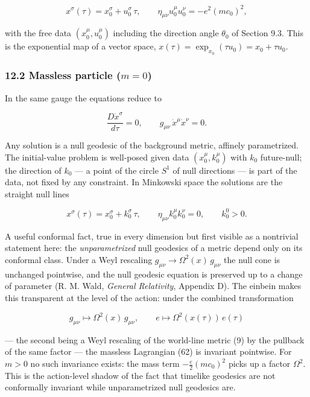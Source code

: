 \documentclass[
]{article}
\begin{document}
\[x^{\sigma}(\tau) = x^{\sigma}_{0} + u^{\sigma}_{0}\, \tau, \qquad \eta_{\mu\nu} u^{\mu}_{0} u^{\nu}_{0} = - e^{2} (mc_{0})^{2}, \tag{79}\]

with the free data \((x^{\mu}_{0}, u^{\mu}_{0})\) including the
direction angle \(\theta_{0}\) of Section 9.3. This is the exponential
map of a vector space,
\(x(\tau) = \exp_{x_{0}}(\tau u_{0}) = x_{0} + \tau u_{0}\).

\hypertarget{massless-particle-m-0}{%
\subsubsection{\texorpdfstring{12.2 Massless particle
(\(m = 0\))}{12.2 Massless particle (m = 0)}}\label{massless-particle-m-0}}

In the same gauge the equations reduce to

\[\frac{D \dot{x}^{\sigma}}{d\tau} = 0, \qquad g_{\mu\nu}\, \dot{x}^{\mu} \dot{x}^{\nu} = 0. \tag{80}\]

Any solution is a null geodesic of the background metric, affinely
parametrized. The initial-value problem is well-posed given data
\((x^{\mu}_{0}, k^{\mu}_{0})\) with \(k_{0}\) future-null; the direction
of \(k_{0}\) --- a point of the circle \(S^{1}\) of null directions ---
is part of the data, not fixed by any constraint. In Minkowski space the
solutions are the straight null lines

\[x^{\sigma}(\tau) = x^{\sigma}_{0} + k^{\sigma}_{0}\, \tau, \qquad \eta_{\mu\nu} k^{\mu}_{0} k^{\nu}_{0} = 0, \qquad k^{0}_{0} > 0. \tag{81}\]

A useful conformal fact, true in every dimension but first visible as a
nontrivial statement here: the \emph{unparametrized} null geodesics of a
metric depend only on its conformal class. Under a Weyl rescaling
\(g_{\mu\nu} \to \Omega^{2}(x)\, g_{\mu\nu}\) the null cone is unchanged
pointwise, and the null geodesic equation is preserved up to a change of
parameter (R. M. Wald, \emph{General Relativity}, Appendix D). The
einbein makes this transparent at the level of the action: under the
combined transformation

\[g_{\mu\nu} \longmapsto \Omega^{2}(x)\, g_{\mu\nu}, \qquad e \longmapsto \Omega^{2}(x(\tau))\, e(\tau) \tag{82}\]

--- the second being a Weyl rescaling of the world-line metric (9) by
the pullback of the same factor --- the massless Lagrangian (62) is
invariant pointwise. For \(m > 0\) no such invariance exists: the mass
term \(-\frac{e}{2}(mc_{0})^{2}\) picks up a factor \(\Omega^{2}\). This
is the action-level shadow of the fact that timelike geodesics are not
conformally invariant while unparametrized null geodesics are.
\end{document}
